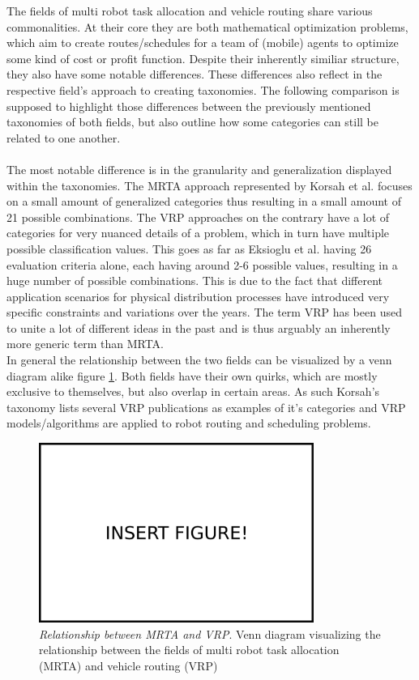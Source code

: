 The fields of multi robot task allocation and vehicle routing share various commonalities. At their core they are both mathematical optimization problems, which aim to create routes/schedules for a team of (mobile) agents to optimize some kind of cost or profit function. Despite their inherently similiar structure, they also have some notable differences. These differences also reflect in the respective field's approach to creating taxonomies. The following comparison is supposed to highlight those differences between the previously mentioned taxonomies of both fields, but also outline how some categories can still be related to one another. \\ \\
The most notable difference is in the granularity and generalization displayed within the taxonomies. The MRTA approach represented by Korsah et al. \cite{korsah_comprehensive_2013} focuses on a small amount of generalized categories thus resulting in a small amount of 21 possible combinations. The VRP approaches on the contrary have a lot of categories for very nuanced details of a problem, which in turn have multiple possible classification values. This goes as far as Eksioglu et al. having 26 evaluation criteria alone, each having around 2-6 possible values, resulting in a huge number of possible combinations. This is due to the fact that different application scenarios for physical distribution processes have introduced very specific constraints and variations over the years. The term VRP has been used to unite a lot of different ideas in the past and is thus arguably an inherently more generic term than MRTA.\\
In general the relationship between the two fields can be visualized by a venn diagram alike figure \ref{fig:venn-vrp-mrta}. Both fields have their own quirks, which are mostly exclusive to themselves, but also overlap in certain areas. As such Korsah's taxonomy lists several VRP publications as examples of it's categories and VRP models/algorithms are applied to robot routing and scheduling problems.
\begin{figure}
\centering
\includegraphics[width=0.8\textwidth]{img/insert_figure_here.png}
\caption[Multi-Robot Task Allocation Taxonomy]{\label{fig:venn-vrp-mrta} \textit{Relationship between MRTA and VRP}. Venn diagram visualizing the relationship between the fields of multi robot task allocation (MRTA) and vehicle routing (VRP)}
\end{figure}
